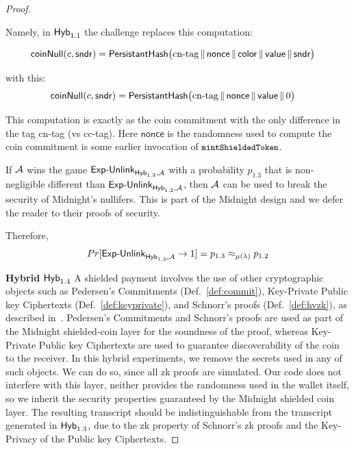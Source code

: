 \begin{proof}
\begin{enumerate}
 Namely, in   $\mathsf{Hyb}_{1.1}$ the challenge replaces this computation:

\begin{align*}
{\mathsf{coinNull}(c, \mathsf{sndr})} &= \mathsf{PersistantHash}\bigl(\text{cn-tag} \,\|\, \mathsf{nonce} \,\|\,
  \mathsf{color} \,\|\, \mathsf{value} \,\|\, \mathsf{sndr}\bigr)
\end{align*}

with  this:
\begin{align*}
{\mathsf{coinNull}(c, \mathsf{sndr})} &= \mathsf{PersistantHash}\bigl(\text{cn-tag} \,\|\, \mathsf{nonce}  \,\|\, \mathsf{value}\,\|\,  0 \bigr)
\end{align*}

This computation is exactly as the coin commitment with the only difference in the tag   \textsf{cn-tag} (vs \textsf{cc-tag}). Here $\mathsf{nonce}$  is the randomness used to compute the coin commitment is some earlier invocation of $\texttt{\small mintShieldedToken}$.

 If $\mathcal{A}$ wins the game $\mathsf{Exp\text{-}Unlink}_{\mathsf{Hyb}_{1.3},\mathcal{A}}$ with a probability $p_{1.3}$ that is non-negligible different than $\mathsf{Exp\text{-}Unlink}_{\mathsf{Hyb}_{1.2},\mathcal{A}}$,  then $\mathcal{A}$ can be used to break the security of Midnight's nullifers.
 This is part of the Midnight design and we defer the reader to their proofs of security.

Therefore, $$Pr[\mathsf{Exp\text{-}Unlink}_{\mathsf{Hyb}_{1.3},\mathcal{A}}  \rightarrow 1]=  p_{1.3}\approx_{\mu(\lambda)}  p_{1.2}$$
\end{enumerate}


 \item \textbf{Hybrid $\mathsf{Hyb}_{1.4}$  }
A shielded payment involves the use of other cryptographic objects  such as Pedersen's Commitments (Def.~\ref{def:commit}), Key-Private Public key Ciphertexts (Def.~\ref{def:keyprivate}), and Schnorr's proofs (Def.~\ref{def:hvzk}), as described in~\cite{Zswap22}.
Pedersen's Commitments  and Schnorr's proofs are used as part of the Midnight shielded-coin layer for the soundness of the proof, whereas Key-Private Public key Ciphertexts are used to
guarantee discoverability of the coin  to the receiver.
In this hybrid experiments, we  remove the secrets used in any of such objects. We can do so, since all zk proofs are simulated.
Our code does not interfere with this layer, neither provides the randomness used in the wallet itself, so we inherit the security properties guaranteed by the Midnight shielded coin layer.
The  resulting transcript should  be indistinguishable from the transcript generated in  $\mathsf{Hyb}_{1.3}$,  due to the zk property of Schnorr's zk proofs and  the Key-Privacy of the  Public key Ciphertexts.



\end{proof}

